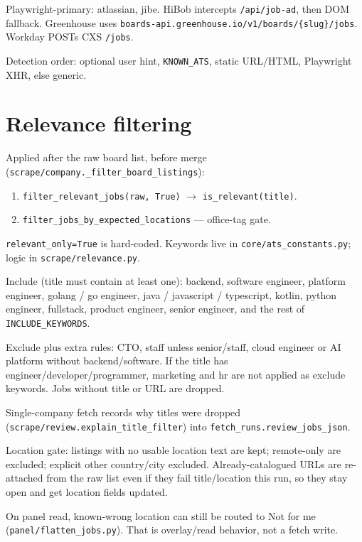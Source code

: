 \documentclass[11pt,a4paper]{article}
\begin{document}
Playwright-primary: atlassian, jibe. HiBob intercepts \texttt{/api/job-ad},
then DOM fallback. Greenhouse uses
\texttt{boards-api.greenhouse.io/v1/boards/\{slug\}/jobs}. Workday POSTs CXS
\texttt{/jobs}.

Detection order: optional user hint, \texttt{KNOWN\_ATS}, static URL/HTML,
Playwright XHR, else generic.

\section{Relevance filtering}

Applied after the raw board list, before merge
(\texttt{scrape/company.\_filter\_board\_listings}):

\begin{enumerate}
  \item \texttt{filter\_relevant\_jobs(raw, True)} $\rightarrow$
        \texttt{is\_relevant(title)}.
  \item \texttt{filter\_jobs\_by\_expected\_locations} --- office-tag gate.
\end{enumerate}

\texttt{relevant\_only=True} is hard-coded. Keywords live in
\texttt{core/ats\_constants.py}; logic in \texttt{scrape/relevance.py}.

Include (title must contain at least one): backend, software engineer,
platform engineer, golang / go engineer, java / javascript / typescript,
kotlin, python engineer, fullstack, product engineer, senior engineer, and
the rest of \texttt{INCLUDE\_KEYWORDS}.

Exclude plus extra rules: CTO, staff unless senior/staff, cloud engineer or
AI platform without backend/software. If the title has
engineer/developer/programmer, marketing and hr are not applied as exclude
keywords. Jobs without title or URL are dropped.

Single-company fetch records why titles were dropped
(\texttt{scrape/review.explain\_title\_filter}) into
\texttt{fetch\_runs.review\_jobs\_json}.

Location gate: listings with no usable location text are kept; remote-only
are excluded; explicit other country/city excluded. Already-catalogued URLs
are re-attached from the raw list even if they fail title/location this run,
so they stay open and get location fields updated.

On panel read, known-wrong location can still be routed to Not for me
(\texttt{panel/flatten\_jobs.py}). That is overlay/read behavior, not a fetch
write.
\end{document}
